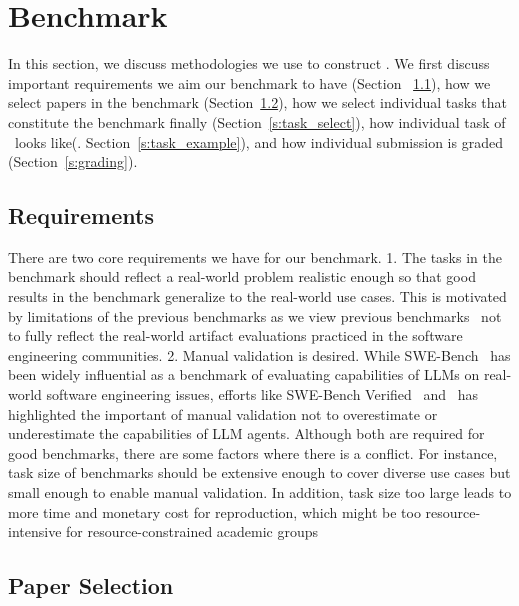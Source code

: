 \section{Benchmark}
\label{s:benchmark}

In this section, we discuss methodologies we use to construct \benchmark.
We first discuss important requirements we aim our benchmark to have (Section ~\ref{s:requirements}), how we select papers in the benchmark (Section~\ref{s:paper_select}), how we select individual tasks that constitute the benchmark finally (Section~\ref{s:task_select}), how individual task of \benchmark~looks like(. Section~\ref{s:task_example}), and how individual submission is graded (Section~\ref{s:grading}).

\subsection{Requirements}
\label{s:requirements}

There are two core requirements we have for our benchmark.
1. The tasks in the benchmark should reflect a real-world problem realistic enough so that good results in the benchmark generalize to the real-world use cases.
This is motivated by limitations of the previous benchmarks as we view previous benchmarks~\cite{DBLP:conf/emnlp/BoginYG0BCSK24, DBLP:journals/tmlr/SiegelKNSN24, DBLP:conf/acl/HuZLWPK25} not to fully reflect the real-world artifact evaluations practiced in the software engineering communities.
2. Manual validation is desired. While SWE-Bench~\cite{jimenez2024swebench} has been widely influential as a benchmark of evaluating capabilities of LLMs on real-world software engineering issues, efforts like SWE-Bench Verified~\cite{chowdhury2024swebenchverified} and~\cite{DBLP:journals/corr/abs-2503-15223} has highlighted the important of manual validation not to overestimate or underestimate the capabilities of LLM agents.
Although both are required for good benchmarks, there are some factors where there is a conflict.
For instance, task size of benchmarks should be extensive enough to cover diverse use cases but small enough to enable manual validation.
In addition, task size too large leads to more time and monetary cost for reproduction, which might be too resource-intensive for resource-constrained academic groups~\cite{DBLP:conf/iclr/ChanCJASMSLMPMW25}

\subsection{Paper Selection}
\label{s:paper_select}

